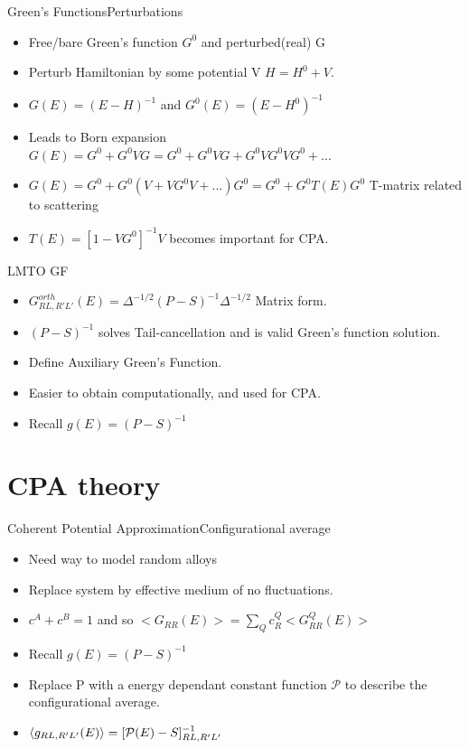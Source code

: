 \documentclass{beamer}
\begin{document}
\begin{frame}{Green's Functions}{Perturbations}
    \begin{itemize}
        \item {Free/bare Green's function $G^0$ and perturbed(real) G}
        \item{Perturb Hamiltonian by some potential V $H=H^0+V$.}
        \item{$G(E)=(E-H)^{-1}$ and $G^0(E)=(E-H^0)^{-1}$}
        \item{Leads to Born expansion $G(E)=G^0+G^0VG=G^0+G^0VG+G^0VG^0VG^0+...$}
        \item{$G(E)=G^0+G^0(V+VG^0V+...)G^0=G^0+G^0T(E)G^0$ T-matrix related to scattering}
        \item{$T(E)=[1-VG^0]^{-1}V$ becomes important for CPA.}
    \end{itemize}
\end{frame}

\begin{frame}{LMTO GF}
    \begin{itemize}
        \item {$G^{orth}_{RL,R'L'}(E)=\Delta^{-1/2}(P-S)^{-1}\Delta^{-1/2}$ Matrix form.}
        \item{$(P-S)^{-1}$ solves Tail-cancellation and is valid Green's function solution.}
        \item{Define Auxiliary Green's Function.}
        \item{Easier to obtain computationally, and used for CPA.}
        \item{Recall $g(E)=(P-S)^{-1}$}
    \end{itemize}
\end{frame}
\section{CPA theory}
\begin{frame}{Coherent Potential Approximation}{Configurational average}
    \begin{itemize}
        \item{Need way to model random alloys}
        \item{Replace system by effective medium of no fluctuations.}
        \item{$c^A+c^B=1$ and so $<G_{RR}(E)>= \sum_Q c_R^Q <G_{RR}^Q(E)>$}
        \item{Recall $g(E)=(P-S)^{-1}$}
        \item{Replace P with a energy dependant constant function $\mathcal{P}$ to describe the configurational average. }
        \item{$\expval{g_{RL,R'L'}(E)}=[\mathcal{P}(E)-S]^{-1}_{RL,R'L'}$}
        
    \end{itemize}
\end{frame}
\end{document}

